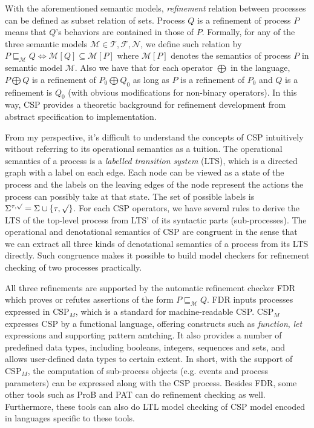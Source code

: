 \documentclass{llncs}
\newcommand{\csptick}{\surd}
\newcommand{\csptau}{\tau}
\newcommand{\csptracesmodel}{\mathcal{T}}
\newcommand{\cspfdrmodel}{\mathcal{N}}
\newcommand{\cspfailuresmodel}{\mathcal{F}}
\newcommand{\cspm}{CSP$_M$}
\begin{document}
With the aforementioned semantic models, \emph{refinement} relation between
processes can be defined as subset relation of sets. Process $Q$ is a
refinement of process $P$ means that $Q$'s behaviors are contained in those of
$P$. Formally, for any of the three semantic models $\mathcal{M} \in
{\csptracesmodel, \cspfailuresmodel, \cspfdrmodel}$, we define such relation by
$P \sqsubseteq_{\mathcal{M}} Q \iff \mathcal{M}[Q] \subseteq \mathcal{M}[P]$
where $\mathcal{M}[P]$ denotes the semantics of process $P$ in semantic model
$\mathcal{M}$. Also we have that for each operator $\bigoplus$ in the language,
$P \bigoplus Q$ is a refinement of $P_0 \bigoplus Q_0$ as long as $P$ is a
refinement of $P_0$ and $Q$ is a refinement is $Q_0$ (with obvious modifications
for non-binary operators). In this way, CSP provides a theoretic background
for refinement development from abstract specification to implementation.

From my perspective, it's difficult to understand the concepts of CSP
intuitively without referring to its operational semantics as a tuition.
The operational semantics of a process is a \emph{labelled transition system} (LTS), 
which is a directed graph with a label on each edge. Each node can be viewed as
a state of the process and the labels on the leaving edges of the node represent
the actions the process can possibly take at that state. The set of
possible labels is $\Sigma^{\csptau, \csptick} = \Sigma \cup \{\csptau, \csptick\}$. 
For each CSP operators, we have several rules to derive the LTS of the
top-level process from LTS' of its syntactic parts (sub-processes). 
The operational and denotational semantics of CSP are congruent in the sense
that we can extract all three kinds of denotational semantics of a process from its
LTS directly. Such congruence makes it possible to build model checkers for
refinement checking of two processes practically.

All three refinements are supported by the automatic refinement checker FDR
which proves or refutes assertions of the form $P \sqsubseteq_{\mathcal{M}} Q$.
FDR inputs processes expressed in \cspm, which is a standard for
machine-readable CSP. \cspm expresses CSP by a functional language, offering
constructs such as \emph{function}, \emph{let} expressions and supporting
pattern amtching. It also provides a number of predefined data types, including
booleans, integers, sequences and sets, and allows user-defined data types to
certain extent. In short, with the support of \cspm, the computation of 
sub-process objects (e.g. events and process parameters) can be expressed along
with the CSP process.  Besides FDR, some other tools such as ProB and PAT can
do refinement checking as well. Furthermore, these tools can also do 
LTL model checking of CSP model encoded in languages specific to these tools.
\end{document}

